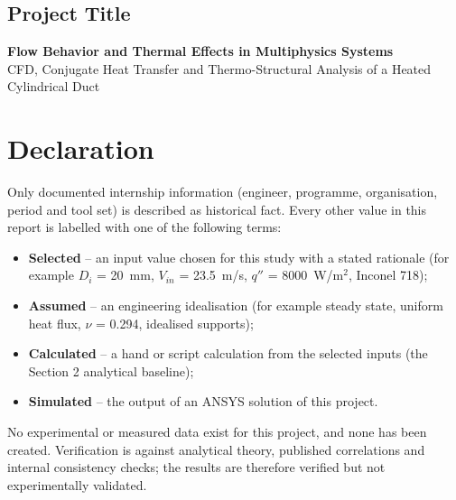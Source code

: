 \section*{Project Title}
\textbf{Flow Behavior and Thermal Effects in Multiphysics Systems}\\
CFD, Conjugate Heat Transfer and Thermo-Structural Analysis of a Heated Cylindrical Duct

\chapter*{Declaration}

Only documented internship information (engineer, programme, organisation, period and tool set) is described as historical fact.
Every other value in this report is labelled with one of the following terms:

\begin{itemize}
\item \textbf{Selected} -- an input value chosen for this study with a stated rationale (for example $D_i$ = 20~mm, $V_{in}$ = 23.5~m/s, $q''$ = 8000~W/m$^2$, Inconel 718);
\item \textbf{Assumed} -- an engineering idealisation (for example steady state, uniform heat flux, $\nu$ = 0.294, idealised supports);
\item \textbf{Calculated} -- a hand or script calculation from the selected inputs (the Section 2 analytical baseline);
\item \textbf{Simulated} -- the output of an ANSYS solution of this project.
\end{itemize}

No experimental or measured data exist for this project, and none has been created. Verification is against analytical theory,
published correlations and internal consistency checks; the results are therefore verified but not experimentally validated.

